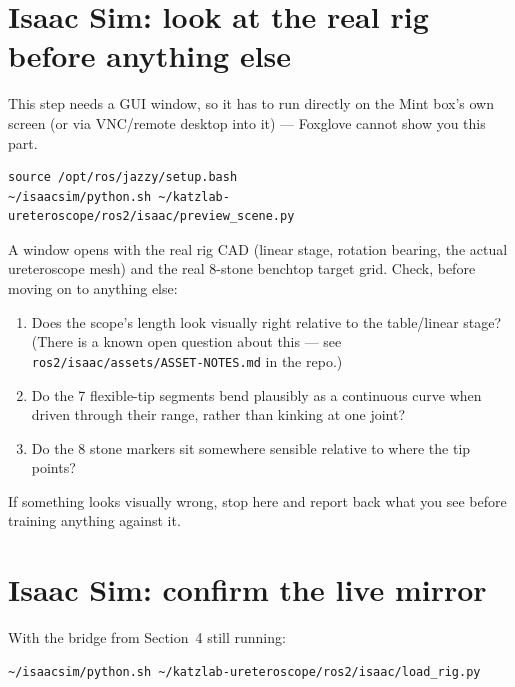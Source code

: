 \documentclass[11pt]{article}
\begin{document}
\section{Isaac Sim: look at the real rig before anything else}

This step needs a GUI window, so it has to run directly on the Mint
box's own screen (or via VNC/remote desktop into it) --- Foxglove cannot
show you this part.

\begin{lstlisting}
source /opt/ros/jazzy/setup.bash
~/isaacsim/python.sh ~/katzlab-ureteroscope/ros2/isaac/preview_scene.py
\end{lstlisting}

A window opens with the real rig CAD (linear stage, rotation bearing,
the actual ureteroscope mesh) and the real 8-stone benchtop target grid.
Check, before moving on to anything else:

\begin{enumerate}
  \item Does the scope's length look visually right relative to the
        table/linear stage? (There is a known open question about this
        --- see \texttt{ros2/isaac/assets/ASSET-NOTES.md} in the repo.)
  \item Do the 7 flexible-tip segments bend plausibly as a continuous
        curve when driven through their range, rather than kinking at
        one joint?
  \item Do the 8 stone markers sit somewhere sensible relative to where
        the tip points?
\end{enumerate}

If something looks visually wrong, stop here and report back what you
see before training anything against it.

\section{Isaac Sim: confirm the live mirror}

With the bridge from Section~4 still running:

\begin{lstlisting}
~/isaacsim/python.sh ~/katzlab-ureteroscope/ros2/isaac/load_rig.py
\end{lstlisting}
\end{document}
